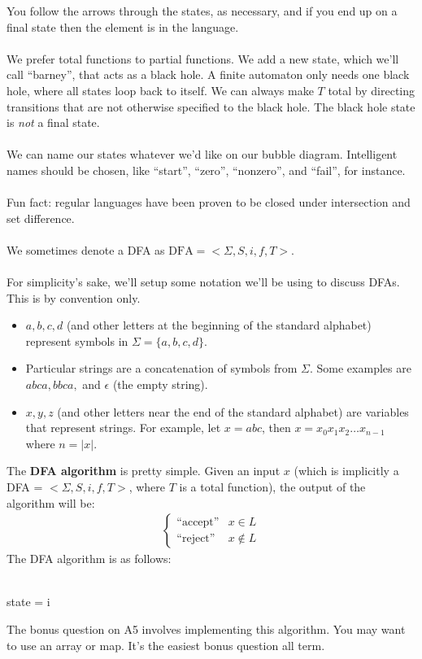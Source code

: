 \documentclass[]{article}
\theoremstyle{definition}
\newcommand{\lecture}[1]{\marginpar{{\footnotesize $\leftarrow$ \underline{#1}}}}
\begin{document}
				You follow the arrows through the states, as necessary, and if you end up on a final state then the element is in the language.
				\\ \\
				We prefer total functions to partial functions. We add a new state, which we'll call ``barney'', that acts as a black hole. A finite automaton only needs one black hole, where all states loop back to itself. We can always make $T$ total by directing transitions that are not otherwise specified to the black hole. The black hole state is \emph{not} a final state.
				\\ \\
				We can name our states whatever we'd like on our bubble diagram. Intelligent names should be chosen, like ``start'', ``zero'', ``nonzero'', and ``fail'', for instance.
				\\ \\
				Fun fact: regular languages have been proven to be closed under intersection and set difference. \lecture{February 6, 2013}
				\\ \\
				We sometimes denote a DFA as $\text{DFA} = < \Sigma, S, i, f, T >$.
				\\ \\
				For simplicity's sake, we'll setup some notation we'll be using to discuss DFAs. This is by convention only.
				\begin{itemize}
					\item $a, b, c, d$ (and other letters at the beginning of the standard alphabet) represent symbols in $\Sigma = \{a, b, c, d\}$.
					\item Particular strings are a concatenation of symbols from $\Sigma$. Some examples are $abca, bbca,$ and $\epsilon$ (the empty string).
					\item $x, y, z$ (and other letters near the end of the standard alphabet) are variables that represent strings. For example, let $x = abc$, then $x = x_0 x_1 x_2 \ldots x_{n - 1}$ where $n = |x|$.
				\end{itemize}
				The \textbf{DFA algorithm} is pretty simple. Given an input $x$ (which is implicitly a DFA = $< \Sigma, S, i, f, T >$, where $T$ is a total function), the output of the algorithm will be:
				\begin{align*}
					\begin{cases}
						\text{``accept''} & x \in L \\
						\text{``reject''} & x \not \in L
					\end{cases}
				\end{align*}
				The DFA algorithm is as follows: \\ \\
				\begin{algorithm}[H]
					state = i\;
				\end{algorithm}
				\vspace{0.5cm}
				The bonus question on A5 involves implementing this algorithm. You may want to use an array or map. It's the easiest bonus question all term.
\end{document}
